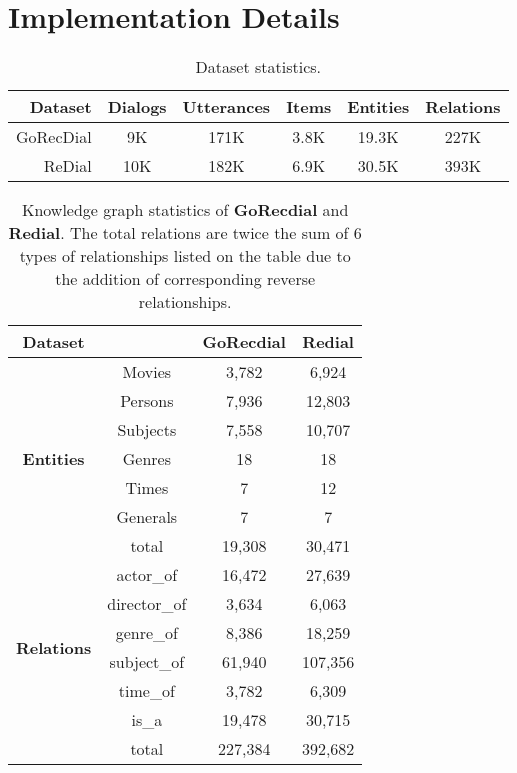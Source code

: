 \documentclass[11pt]{article}
\begin{document}
\section{Implementation Details}

\begin{table}[htb]
    \centering
    \small
    \begin{tabular}{r@{~~}c@{~~}c@{~~}c@{~~}c@{~~}c}
    \toprule
        Dataset & Dialogs & Utterances & Items & Entities & Relations \\
    \midrule
        GoRecDial & 9K & 171K & 3.8K & 19.3K & 227K \\
        ReDial & 10K & 182K & 6.9K & 30.5K & 393K \\
    \bottomrule
    \end{tabular}
    \caption{Dataset statistics.}
    \label{tab:dataset}
\end{table}

\begin{table}[t]
    \centering
    \small
    \begin{tabular}{cccc}
    \toprule
        \textbf{Dataset} & &\textbf{GoRecdial} & \textbf{Redial}\\
    \midrule
        \multirow{7}{*}{\textbf{Entities}} & Movies & 3,782 & 6,924\\
        &Persons & 7,936 & 12,803\\
        &Subjects & 7,558 & 10,707\\
        &Genres & 18 & 18\\
        &Times & 7 & 12\\
        &Generals & 7 & 7\\
        &total & 19,308 & 30,471\\
    \midrule
        \multirow{6}{*}{\textbf{Relations}} &actor\_of & 16,472 & 27,639\\
            &director\_of & 3,634  & 6,063\\
            &genre\_of & 8,386 & 18,259\\
            &subject\_of  & 61,940 & 107,356\\
            &time\_of & 3,782 & 6,309\\
            &is\_a & 19,478 & 30,715\\
            &total & 227,384 & 392,682 \\
    \bottomrule
    \end{tabular}
    \caption{Knowledge graph statistics of \textbf{GoRecdial} and \textbf{Redial}. The total relations are twice the sum of 6 types of relationships listed on the table due to the addition of corresponding reverse relationships.}
    \label{tab:data}
\end{table}
\end{document}
